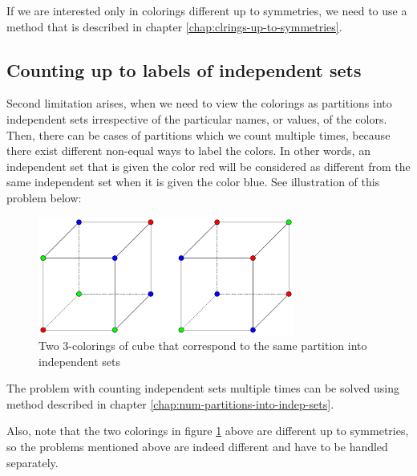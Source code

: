 If we are interested only in colorings different up to symmetries, we need to use a method that is described in chapter \ref{chap:clrings-up-to-symmetries}.

\subsection{Counting up to labels of independent sets}

Second limitation arises, when we need to view the colorings as partitions into independent sets irrespective of the particular names, or values, of the colors. Then, there can be cases of partitions which we count multiple times, because there exist different non-equal ways to label the colors. In other words, an independent set that is given the color red will be considered as different from the same independent set when it is given the color blue. See illustration of this problem below:

\begin{figure}[H]
    \centering
    \includegraphics[width=0.75\textwidth]{Resources/Figs/cube_relabelings_problem.pdf}
    \caption{Two 3-colorings of cube that correspond to the same partition into independent sets}
    \label{fig:cube-clrings-same-partition}
\end{figure}

The problem with counting independent sets multiple times can be solved using method described in chapter \ref{chap:num-partitions-into-indep-sets}. 

Also, note that the two colorings in figure \ref{fig:cube-clrings-same-partition} above are different up to symmetries, so the problems mentioned above are indeed different and have to be handled separately.

